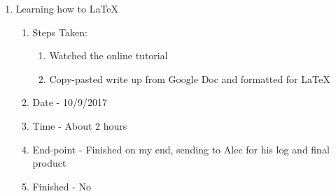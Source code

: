 \documentclass[letterpaper,10pt,fleqn]{article}
\begin{document}
\begin{enumerate}
	\item Learning how to LaTeX
		\begin{enumerate}
			\item Steps Taken:
				\begin{enumerate}
					\item Watched the online tutorial
					\item Copy-pasted write up from Google Doc and formatted for LaTeX
				\end{enumerate}
			\item Date - 10/9/2017
			\item Time - About 2 hours
			\item End-point - Finished on my end, sending to Alec for his log and final product
			\item Finished -  No
		\end {enumerate}	
        \end {enumerate}
		
\end{document}
